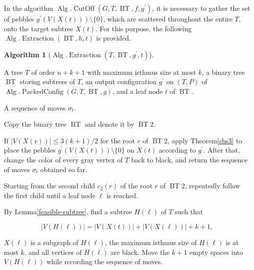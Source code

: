 \documentclass[letter,11pt]{article}
\theoremstyle{definition}
\theoremstyle{definition}
\newtheorem{alg}{Algorithm}
\DeclareMathOperator{\BT}{BT}
\DeclareMathOperator{\Alg}{Alg}
\DeclareMathOperator{\PacCon}{PackedConfig}
\DeclareMathOperator{\CutOff}{CutOff}
\DeclareMathOperator{\Extraction}{Extraction}
\newcommand{\1}{\boldmath$~1~$\unboldmath}
\newcommand{\tume}{\hspace*{0.2em}}
\newcommand{\maru}[1]{{\ooalign{\hfill$\small#1$\hfill\crcr\scalebox{1.3}{$\bigcirc$}}}}
\newenvironment{alg-enumerate}{%
  \begin{enumerate}%
   \renewcommand{\theenumi}{\arabic{enumi}}%
   \renewcommand{\labelenumi}{\rm{{\maru{\theenumi}}\tume\/}}%
   \renewcommand{\labelenumii}{\rm{$(${\maru{\theenumi}}-\theenumii$)$\tume\/}}%
 }{\end{enumerate}%
}
\newcommand{\namelistlabel}[1]{\hspace*{10pt}\mbox{#1}:\hspace{\fill}}
\newenvironment{namelist}[1]{%
    \begin{list}{}
      {\let\makelabel\namelistlabel
      \settowidth{\labelwidth}{#1}
      \setlength{\leftmargin}{1.1\labelwidth}
      \setlength{\labelsep}{5pt}
      \setlength{\parsep}{0pt}}
  }{%
  \end{list}}
\begin{document}
\noindent
In the algorithm $\Alg.\CutOff(G,T,\BT,f,g^{\prime})$, it is necessary to gather the set of pebbles $g^{\prime}(V(X(t)))\setminus\{0\}$, which are scattered throughout the entire $T$, onto the target subtree $X(t)$. For this purpose, the following $\Alg.\Extraction(\BT,h,t)$ is provided. 
\begin{alg}[$\Alg.\Extraction(T, \BT,g^{\prime},t)$]\hfill
\begin{namelist}{OUTPUT}
\item[\sl Input]{A tree $T$ of order $n + k + 1$ with maximum isthmus size at most $k$,
a binary tree $\BT$ storing subtrees of $T$, an output configuration $g^{\prime}$ on $(T,P)$ of $\Alg.\PacCon(G,T,\BT,g)$,
and a leaf node $t$ of $\BT$.}

\item[\sl Output]{A sequence of moves $\sigma_t$.}
\end{namelist}

\begin{alg-enumerate}

\item Copy the binary tree $\BT$ and denote it by $\BT2$.

\item If $|V(X(r))| \le 3(k+1)/2$ for the root $r$ of $\BT2$,  
apply Theorem\tume\ref{sbs3} to place the pebbles
$g^{\prime}(V(X(t)))\setminus\{0\}$ on $X(t)$ according to $g^{\prime}$.
After that, change the color of every gray vertex of $T$ back to black,
and return the sequence of moves $\sigma_t$ obtained so far.
\label{initial-check2}

\item Starting from the second child $c_2(r)$ of the root $r$ of $\BT2$,
repeatedly follow the first child until a leaf node $\ell$ is reached.

\item By Lemma\tume\ref{feasible-subtree}, find a subtree $H(\ell)$ of $T$
such that

\[
|V(H(\ell))|
=
|V(X(t))| + |V(X(\ell))| + k + 1 ,
\]

$X(\ell)$ is a subgraph of $H(\ell)$,
the maximum isthmus size of $H(\ell)$ is at most $k$,
and all vertices of $H(\ell)$ are black.
Move the $k+1$ empty spaces into $V(H(\ell))$
while recording the sequence of moves.
\label{mini-puzzle}


\end{alg-enumerate}
\end{alg}
\end{document}
